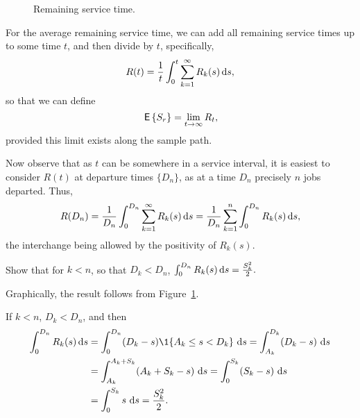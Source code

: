 \begin{figure}[ht]
  \centering
{}

  \caption{Remaining service time.}
  \label{fig:mg1remainingservicetime}
\end{figure}


For the average remaining service time, we can add all remaining
service times up to some time $t$, and then divide by $t$,
specifically,
\begin{equation*}
R(t) = \frac{1}t \int_0^t \sum_{k=1}^\infty R_k(s) \,\text{d}s,
\end{equation*}
so that we can define
\begin{equation*}
  \,\mathsf{E}\left\{S_r\right\} = \lim_{t\to\infty} R_t,
\end{equation*}
provided this limit exists along the sample path.

Now observe that as $t$ can be somewhere in a service interval, it is
easiest to consider $R(t)$ at departure times $\{D_n\}$, as at a time
$D_n$ precisely $n$ jobs departed. Thus,
\begin{align*}
R(D_n)
= \frac{1}{D_n} \int_0^{D_n} \sum_{k=1}^\infty R_k(s) \,\text{d}s 
= \frac{1}{D_n} \sum_{k=1}^n \int_0^{D_n}  R_k(s) \,\text{d}s,
\end{align*}
the interchange being allowed by the positivity of $R_k(s)$.  

\begin{exercise}
Show that for $k<n$, so that $D_k< D_n$,
$\int_0^{D_n} R_k(s) \,\text{d}s = \frac{S_k^2}2.$
\begin{hint}
  Graphically, the result follows from Figure~\ref{fig:mg1remainingservicetime}.   
\end{hint}
\begin{solution}
If $k<n$,  $D_k< D_n$, and then
\begin{align*}
\int_0^{D_n} R_k(s) \d s
&= \int_0^{D_n} (D_k-s)\1{A_k \leq s < D_k}\, \d s = \int_{A_k}^{D_k} (D_k-s) \, \d s \\
&= \int_{A_k}^{A_k+S_k} (A_k+S_k-s) \, \d s  = \int_{0}^{S_k} (S_k-s) \, \d s \\
&= \int_{0}^{S_k} s \, \d s = \frac{S_k^2}2.
\end{align*}
  \end{solution}
\end{exercise}

